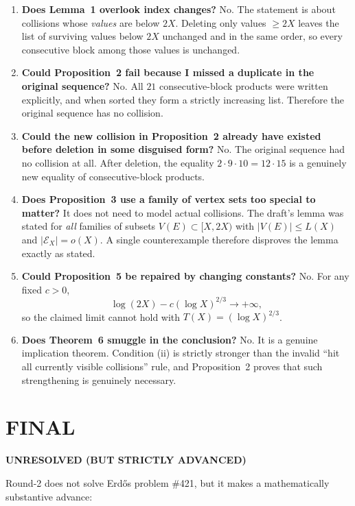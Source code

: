 \begin{enumerate}
\item \textbf{Does Lemma~1 overlook index changes?} No. The statement is about collisions whose \emph{values} are below $2X$. Deleting only values $\ge 2X$ leaves the list of surviving values below $2X$ unchanged and in the same order, so every consecutive block among those values is unchanged.

\item \textbf{Could Proposition~2 fail because I missed a duplicate in the original sequence?} No. All $21$ consecutive-block products were written explicitly, and when sorted they form a strictly increasing list. Therefore the original sequence has no collision.

\item \textbf{Could the new collision in Proposition~2 already have existed before deletion in some disguised form?} No. The original sequence had no collision at all. After deletion, the equality $2\cdot 9\cdot 10=12\cdot 15$ is a genuinely new equality of consecutive-block products.

\item \textbf{Does Proposition~3 use a family of vertex sets too special to matter?} It does not need to model actual collisions. The draft's lemma was stated for \emph{all} families of subsets $V(E)\subset [X,2X)$ with $|V(E)|\le L(X)$ and $|\mathcal E_X|=o(X)$. A single counterexample therefore disproves the lemma exactly as stated.

\item \textbf{Could Proposition~5 be repaired by changing constants?} No. For any fixed $c>0$,
\[
\log(2X)-c(\log X)^{2/3}\to +\infty,
\]
so the claimed limit cannot hold with $T(X)=(\log X)^{2/3}$.

\item \textbf{Does Theorem~6 smuggle in the conclusion?} No. It is a genuine implication theorem. Condition (ii) is strictly stronger than the invalid ``hit all currently visible collisions'' rule, and Proposition~2 proves that such strengthening is genuinely necessary.
\end{enumerate}

\section{FINAL}

\textbf{UNRESOLVED (BUT STRICTLY ADVANCED)}

Round-2 does not solve Erd\H{o}s problem \#421, but it makes a mathematically substantive advance:

